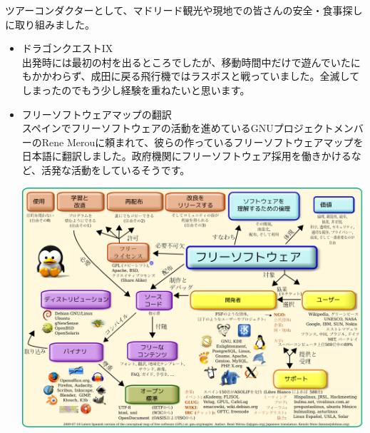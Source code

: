 \documentclass[mingoth,a4paper]{jsarticle}
\begin{document}
ツアーコンダクターとして、マドリード観光や現地での皆さんの安全・食事探しに取り組みました。

\begin{itemize}
\item ドラゴンクエストIX\\
  出発時には最初の村を出るところでしたが、移動時間中だけで遊んでいたにもかかわらず、成田に戻る飛行機ではラスボスと戦っていました。全滅してしまったのでもう少し経験を重ねたいと思います。
\item フリーソフトウェアマップの翻訳\\
  スペインでフリーソフトウェアの活動を進めているGNUプロジェクトメンバーのRene Merouに頼まれて、彼らの作っているフリーソフトウェアマップを日本語に翻訳しました。政府機関にフリーソフトウェア採用を働きかけるなど、活発な活動をしているそうです。
	\begin{minipage}{0.4\hsize}
	\includegraphics[width=2.0\hsize]{image200908/map-ja.png}
	\end{minipage}


\end{itemize}
\end{document}
